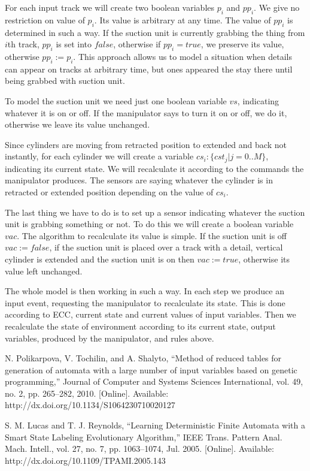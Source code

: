 \documentclass[fleqn,twocolumn]{article}
\begin{document}
For each input track we will create two boolean variables $p_i$ and $pp_i$. We give no restriction on value of $p_i$. Its value is arbitrary at any time.
The value of $pp_i$ is determined in such a way. If the suction unit is currently grabbing the thing from $i$th track, $pp_i$ is set into $false$, otherwise
if $pp_i = true$, we preserve its value, otherwise $pp_i := p_i$. This approach allows us to model a situation when details can appear on tracks at arbitrary
time, but ones appeared the stay there until being grabbed with suction unit.

To model the suction unit we need just one boolean variable $vs$, indicating whatever it is on or off. If the manipulator says to turn it on or off, we do it,
otherwise we leave its value unchanged.

Since cylinders are moving from retracted position to extended and back not instantly, for each cylinder we will create a variable $cs_i : \{ cst_j | j = 0 .. M \}$,
indicating its current state. We will recalculate it according to the commands the manipulator produces. The sensors are saying whatever the cylinder is in
retracted or extended position depending on the value of $cs_i$.

The last thing we have to do is to set up a sensor indicating whatever the suction unit is grabbing something or not. To do this we will create a boolean
variable $vac$. The algorithm to recalculate its value is simple. If the suction unit is off $vac := false$, if the suction unit is placed over a
track with a detail, vertical cylinder is extended and the suction unit is on then $vac := true$, otherwise its value left unchanged.

The whole model is then working in such a way. In each step we produce an input event, requesting the manipulator to recalculate its state. This is done
according to ECC, current state and current values of input variables. Then we recalculate the state of environment according to its current state,
output variables, produced by the manipulator, and rules above.

\begin{thebibliography}{2}

N. Polikarpova, V. Tochilin, and A. Shalyto, “Method of reduced tables for generation of automata with a large number of input variables
based on genetic programming,” Journal of Computer and Systems Sciences International, vol. 49, no. 2, pp. 265–282, 2010. [Online].
Available: http://dx.doi.org/10.1134/S1064230710020127

S. M. Lucas and T. J. Reynolds, “Learning Deterministic Finite Automata with a Smart State Labeling Evolutionary Algorithm,” IEEE
Trans. Pattern Anal. Mach. Intell., vol. 27, no. 7, pp. 1063–1074, Jul. 2005. [Online]. Available: http://dx.doi.org/10.1109/TPAMI.2005.143

\end{thebibliography}
\end{document}
